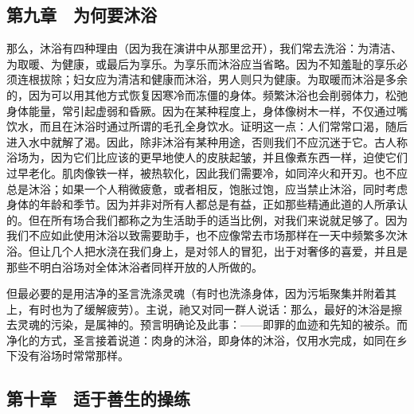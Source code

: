 
\subsection{第九章　为何要沐浴}

那么，沐浴有四种理由（因为我在演讲中从那里岔开），我们常去洗浴：为清洁、为取暖、为健康，或最后为享乐。为享乐而沐浴应当省略。因为不知羞耻的享乐必须连根拔除；妇女应为清洁和健康而沐浴，男人则只为健康。为取暖而沐浴是多余的，因为可以用其他方式恢复因寒冷而冻僵的身体。频繁沐浴也会削弱体力，松弛身体能量，常引起虚弱和昏厥。因为在某种程度上，身体像树木一样，不仅通过嘴饮水，而且在沐浴时通过所谓的毛孔全身饮水。证明这一点：人们常常口渴，随后进入水中就解了渴。因此，除非沐浴有某种用途，否则我们不应沉迷于它。古人称浴场为，因为它们比应该的更早地使人的皮肤起皱，并且像煮东西一样，迫使它们过早老化。肌肉像铁一样，被热软化，因此我们需要冷，如同淬火和开刃。也不应总是沐浴；如果一个人稍微疲惫，或者相反，饱胀过饱，应当禁止沐浴，同时考虑身体的年龄和季节。因为并非对所有人都总是有益，正如那些精通此道的人所承认的。但在所有场合我们都称之为生活助手的适当比例，对我们来说就足够了。因为我们不应如此使用沐浴以致需要助手，也不应像常去市场那样在一天中频繁多次沐浴。但让几个人把水浇在我们身上，是对邻人的冒犯，出于对奢侈的喜爱，并且是那些不明白浴场对全体沐浴者同样开放的人所做的。\par

但最必要的是用洁净的圣言洗涤灵魂（有时也洗涤身体，因为污垢聚集并附着其上，有时也为了缓解疲劳）。主说，祂又对同一群人说话：那么，最好的沐浴是擦去灵魂的污染，是属神的。预言明确论及此事：——即罪的血迹和先知的被杀。而净化的方式，圣言接着说道：肉身的沐浴，即身体的沐浴，仅用水完成，如同在乡下没有浴场时常常那样。\par


\subsection{第十章　适于善生的操练}

